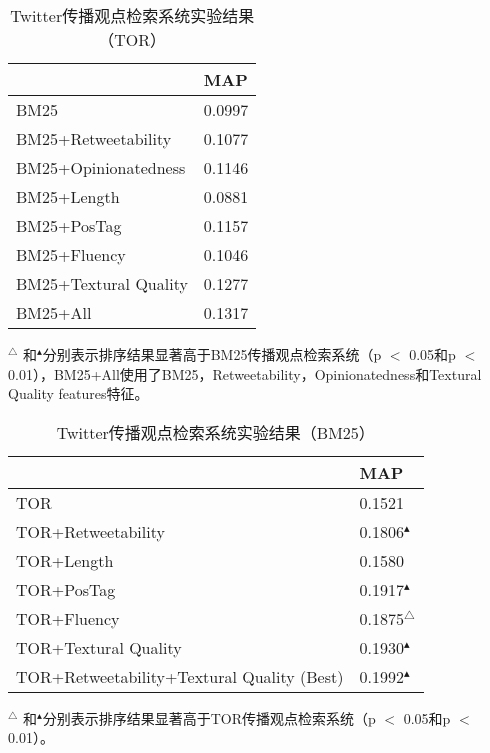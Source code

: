\begin{table}[!htbp]
 \centering
  \caption{Twitter传播观点检索系统实验结果（TOR）}
 \label{TOR_POR}
 \begin{tabular}{|l l|}
 \hline
 & MAP \\
 \hline
 BM25 & 0.0997\\
 BM25+Retweetability & 0.1077\\
  BM25+Opinionatedness & 0.1146 \\
 BM25+Length& 0.0881\\
BM25+PosTag & 0.1157\\
BM25+Fluency& 0.1046\\
BM25+Textural Quality & 0.1277\\
BM25+All& 0.1317\\ 
 \hline
 \end{tabular}
   \begin{tablenotes}
        \footnotesize
\item $^\triangle$ 和$^\blacktriangle$分别表示排序结果显著高于BM25传播观点检索系统（p $<$ 0.05和p $<$ 0.01），BM25+All使用了BM25，Retweetability，Opinionatedness和Textural Quality features特征。
\end{tablenotes}
\end{table}

\begin{table}[!htbp]
 \centering
  \caption{Twitter传播观点检索系统实验结果（BM25）}
 \label{BM25_POR}
 \begin{tabular}{|l l|}
 \hline
 & MAP \\
 \hline
TOR & 0.1521\\
TOR+Retweetability  &0.1806$^\blacktriangle$\\
TOR+Length  &0.1580 \\
TOR+PosTag  &0.1917$^\blacktriangle$\\
TOR+Fluency  &0.1875$^\triangle$\\
TOR+Textural Quality&0.1930$^\blacktriangle$ \\
TOR+Retweetability+Textural Quality (Best)&0.1992$^\blacktriangle$\\
 \hline
 \end{tabular}
   \begin{tablenotes}
        \footnotesize
\item $^\triangle$ 和$^\blacktriangle$分别表示排序结果显著高于TOR传播观点检索系统（p $<$ 0.05和p $<$ 0.01）。
\end{tablenotes}
\end{table}

